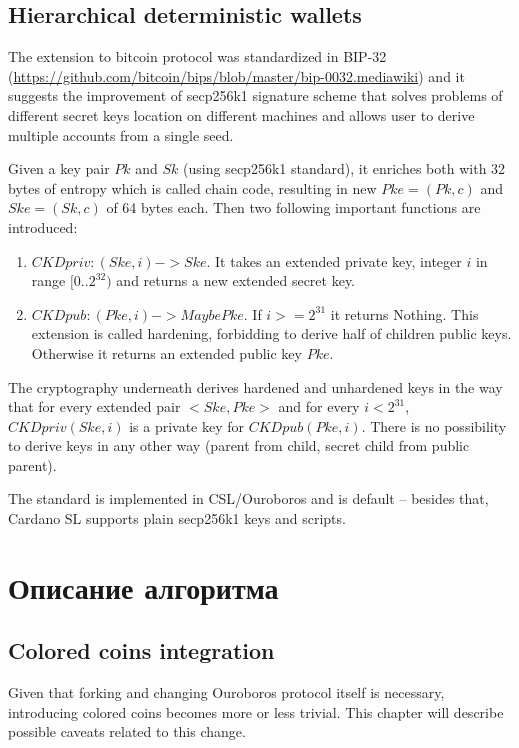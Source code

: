 \documentclass[]{itmo-student-thesis}
\begin{document}
\section{Hierarchical deterministic wallets}

The extension to bitcoin protocol was standardized in BIP-32
(\url{https://github.com/bitcoin/bips/blob/master/bip-0032.mediawiki})
and it suggests the improvement of secp256k1 signature scheme that
solves problems of different secret keys location on different
machines and allows user to derive multiple accounts from a single
seed.

Given a key pair $Pk$ and $Sk$ (using secp256k1 standard), it enriches
both with 32 bytes of entropy which is called chain code, resulting in
new $Pke = (Pk, c)$ and $Ske = (Sk, c)$ of 64 bytes each. Then two
following important functions are introduced:
\begin{enumerate}
\item $CKDpriv : (Ske, i) -> Ske$. It takes an extended private key,
  integer $i$ in range $[0..2^{32})$ and returns a new extended secret
  key.
\item $CKDpub : (Pke, i) -> Maybe Pke$. If $i >= 2^{31}$ it returns
  Nothing. This extension is called hardening, forbidding to derive
  half of children public keys. Otherwise it returns an extended
  public key $Pke$.
\end{enumerate}

The cryptography underneath derives hardened and unhardened keys in
the way that for every extended pair $<Ske,Pke>$ and for every $i <
2^{31}$, $CKDpriv(Ske,i)$ is a private key for $CKDpub(Pke,i)$. There is
no possibility to derive keys in any other way (parent from child,
secret child from public parent).

The standard is implemented in CSL/Ouroboros and is default -- besides
that, Cardano SL supports plain secp256k1 keys and scripts.

\chapter{Описание алгоритма}

\section{Colored coins integration}

Given that forking and changing Ouroboros protocol itself is
necessary, introducing colored coins becomes more or less
trivial. This chapter will describe possible caveats related to this
change.
\end{document}
